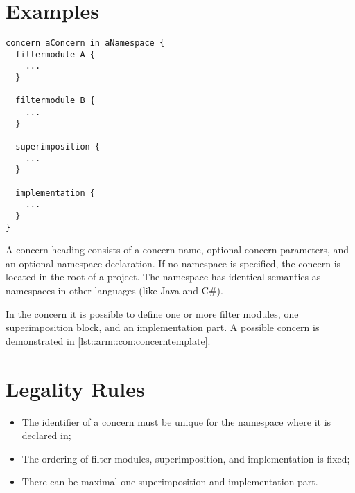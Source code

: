 \section{Examples}
\begin{lstlisting}[language={Composestar},style=floatlisting, caption={Abstract example of a concern}, label={lst::arm::con:concerntemplate}, floatplacement=tbp]
concern aConcern in aNamespace {
  filtermodule A {
    ...
  }
  
  filtermodule B {
    ...
  }
  
  superimposition {
    ...
  }
  
  implementation {
    ...
  }
}
\end{lstlisting}
A concern heading consists of a concern name, optional concern parameters, and an optional namespace declaration.
If no namespace is specified, the concern is located in the root of a project.
The namespace has identical semantics as namespaces in other languages (like Java and C\#).

In the concern it is possible to define one or more filter modules, one superimposition block, and an implementation part. 
A possible concern is demonstrated in \autoref{lst::arm::con:concerntemplate}.

\section{Legality Rules}
\begin{itemize}[noitemsep]
\item The identifier of a concern must be unique for the namespace where it is declared in;
\item The ordering of filter modules, superimposition, and implementation is fixed;
\item There can be maximal one superimposition and implementation part.
\end{itemize}

\comments{}
